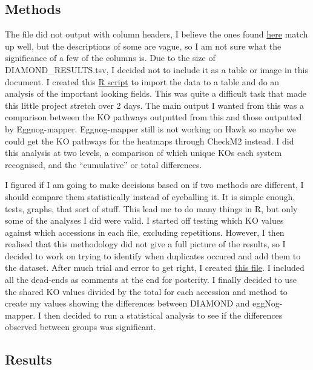 \documentclass[
  letterpaper,
  DIV=11,
  numbers=noendperiod]{scrreprt}
\begin{document}
\subsection{Methods}\label{methods-4}

The file did not output with column headers, I believe the ones found
\href{https://www.metagenomics.wiki/tools/blast/blastn-output-format-6}{here}
match up well, but the descriptions of some are vague, so I am not sure
what the significance of a few of the columns is. Due to the size of
DIAMOND\_RESULTS.tsv, I decided not to include it as a table or image in
this document. I created this
\href{https://github.com/tobiasnunn/tnunn_research/blob/main/Research_Experience_Module/00_scripts/Rscripts/CheckM2diamondanalysis.R}{R
script} to import the data to a table and do an analysis of the
important looking fields. This was quite a difficult task that made this
little project stretch over 2 days. The main output I wanted from this
was a comparison between the KO pathways outputted from this and those
outputted by Eggnog-mapper. Eggnog-mapper still is not working on Hawk
so maybe we could get the KO pathways for the heatmaps through CheckM2
instead. I did this analysis at two levels, a comparison of which unique
KOs each system recognised, and the ``cumulative'' or total differences.

I figured if I am going to make decisions based on if two methods are
different, I should compare them statistically instead of eyeballing it.
It is simple enough, tests, graphs, that sort of stuff. This lead me to
do many things in R, but only some of the analyses I did were valid. I
started off testing which KO values against which accessions in each
file, excluding repetitions. However, I then realised that this
methodology did not give a full picture of the results, so I decided to
work on trying to identify when duplicates occured and add them to the
dataset. After much trial and error to get right, I created
\href{https://github.com/tobiasnunn/tnunn_research/blob/main/Research_Experience_Module/00_scripts/Rscripts/CheckM2diamondanalysis.R}{this
file}. I included all the dead-ends as comments at the end for
posterity. I finally decided to use the shared KO values divided by the
total for each accession and method to create my values showing the
differences between DIAMOND and eggNog-mapper. I then decided to run a
statistical analysis to see if the differences observed between groups
was significant.

\subsection{Results}\label{results-3}
\end{document}
